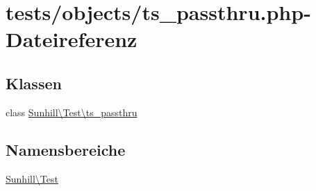 \hypertarget{ts__passthru_8php}{}\section{tests/objects/ts\+\_\+passthru.php-\/\+Dateireferenz}
\label{ts__passthru_8php}
\subsection*{Klassen}
\begin{DoxyCompactItemize}
\item 
class \hyperlink{classSunhill_1_1Test_1_1ts__passthru}{Sunhill\textbackslash{}\+Test\textbackslash{}ts\+\_\+passthru}
\end{DoxyCompactItemize}
\subsection*{Namensbereiche}
\begin{DoxyCompactItemize}
\item 
 \hyperlink{namespaceSunhill_1_1Test}{Sunhill\textbackslash{}\+Test}
\end{DoxyCompactItemize}
